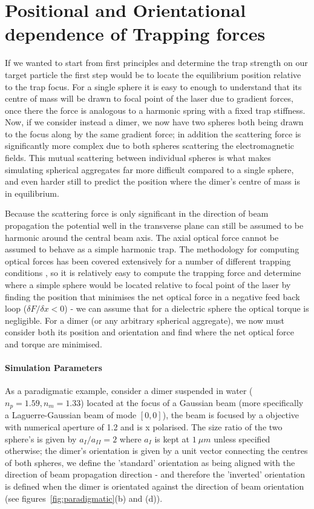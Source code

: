 \section{Positional and Orientational dependence of Trapping forces}
\label{sec:eq_positions}
If we wanted to start from first principles and determine the trap strength 
on our target particle the first step would be to locate the equilibrium position
relative to the trap focus. For a single sphere it is easy to enough to understand 
that its centre of mass will be drawn to focal point of the laser due to gradient
forces, once there the force is analogous to a harmonic spring with a fixed trap
stiffness. Now, if we consider instead a dimer, we now have two spheres both being
drawn to the focus along by the same gradient force; in addition the scattering force
is significantly more complex due to both spheres scattering the electromagnetic 
fields. This mutual scattering between individual spheres is what makes simulating
spherical aggregates far more difficult compared to a single sphere, and even harder
still to predict the position where the dimer's centre of mass is in equilibrium.

Because the scattering force is only significant in the direction of beam 
propagation the potential well in the transverse plane can still be assumed 
to be harmonic around the central beam axis. The axial optical force cannot 
be assumed to behave as a simple harmonic trap. The methodology for computing 
optical forces has been covered extensively for a number of different trapping conditions \cite{RanhaNeves2019}, so it is relatively easy to compute the 
trapping force and determine where a simple sphere would be located relative 
to focal point of the laser by finding the position that minimises the net 
optical force in a negative feed back loop ($\delta F/\delta x < 0$) - we can 
assume that for a dielectric sphere the optical torque is negligible. For a 
dimer (or any arbitrary spherical aggregate), we now must consider both its 
position and orientation and find where the net optical force and torque are 
minimised. 

\paragraph{Simulation Parameters}
As a paradigmatic example, consider a dimer suspended in water ($n_p = 1.59, 
n_m = 1.33$) located at the focus of a Gaussian beam (more specifically a Laguerre-Gaussian beam of mode $[0,0]$), the beam is focused by a objective 
with numerical aperture of 1.2 and is x polarised. The size ratio of the two 
sphere's is given by $a_{I}/a_{II} = 2$ where $a_{I}$ is kept at $1\ \mu m$ 
unless specified otherwise; the dimer's orientation is given by a unit vector connecting the centres of both spheres, we define the 'standard' orientation 
as being aligned with the direction of beam propagation direction - and 
therefore the 'inverted' orientation is defined when the dimer is orientated 
against the direction of beam orientation (see figures~\ref{fig:paradigmatic}(b) 
and (d)). 

